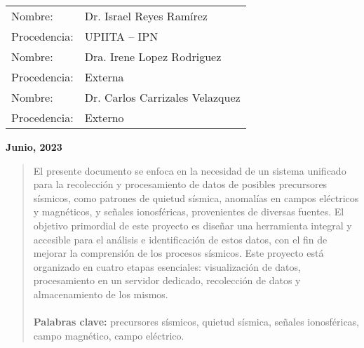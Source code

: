 \begin{titlepage}
\begin{center}
            \vfill


            \begin{center}
                \begin{tabular}{>{\raggedright\arraybackslash}p{3cm} p{10cm}}
                  Nombre:      & Dr. Israel Reyes Ramírez \\
                  Procedencia: & UPIITA – IPN \\
                  Nombre:      & Dra. Irene Lopez Rodriguez \\
                  Procedencia: & Externa  \\
                    Nombre:      & Dr. Carlos Carrizales Velazquez \\
                  Procedencia: & Externo  \\
                \end{tabular}
            \end{center}

            \vfill
            \textbf{Junio, 2023}

 
        \end{center}
    \begin{abstract}
    El presente documento se enfoca en la necesidad de un sistema unificado para la recolección y procesamiento de datos de posibles precursores sísmicos, como patrones de quietud sísmica, anomalías en campos eléctricos y magnéticos, y señales ionosféricas, provenientes de diversas fuentes. El objetivo primordial de este proyecto es diseñar una herramienta integral y accesible para el análisis e identificación de estos datos, con el fin de mejorar la comprensión de los procesos sísmicos. Este proyecto está organizado en cuatro etapas esenciales: visualización de datos, procesamiento en un servidor dedicado, recolección de datos y almacenamiento de los mismos.
        \\ \\
        \textbf{Palabras clave:} precursores sísmicos, quietud sísmica, señales ionosféricas, campo magnético, campo eléctrico.
    \end{abstract}
        
    \end{titlepage}